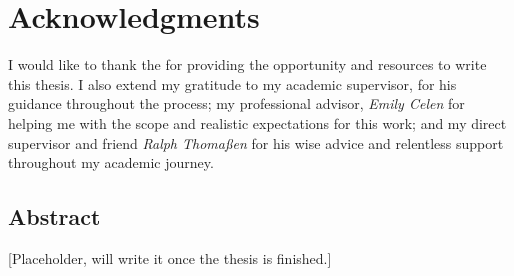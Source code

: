 \thispagestyle{empty}
\section*{Acknowledgments}
I would like to thank the \textit{\myCompany} for providing the opportunity and resources to write this thesis. 
I also extend my gratitude to my academic supervisor, \textit{\mySupervisor{}} for his guidance throughout the process; my professional advisor, \textit{Emily Celen} for helping me with the scope and realistic expectations for this work; and my direct supervisor and friend \textit{Ralph Thomaßen} for his wise advice and relentless support throughout my academic journey.
\newpage

\begin{centering}
\section*{Abstract}
\end{centering}
[Placeholder, will write it once the thesis is finished.] %
\newpage


\tableofcontents \clearpage
\renewcommand{\nomname}{Abbreviations}
\setlength{\nomlabelwidth}{.25\hsize}
\renewcommand{\nomlabel}[1]{#1 \dotfill}
\setlength{\nomitemsep}{-\parsep}
{\small \printnomenclature}
\clearpage
{}